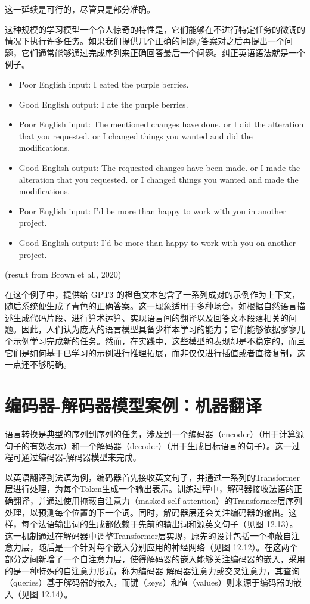 \documentclass[lang=cn,newtx,10pt,scheme=chinese]{elegantbook}
\begin{document}
这一延续是可行的，尽管只是部分准确。

这种规模的学习模型一个令人惊奇的特性是，它们能够在不进行特定任务的微调的情况下执行许多任务。如果我们提供几个正确的问题/答案对之后再提出一个问题，它们通常能够通过完成序列来正确回答最后一个问题。纠正英语语法就是一个例子。

\begin{itemize}
    \item Poor English input: I eated the purple berries.  
    \item Good English output: I ate the purple berries.  
    \item Poor English input: The mentioned changes have done. or I did the alteration that you requested. or I changed things you wanted and did the modifications. 
    \item Good English output: The requested changes have been made. or I made the alteration that you requested. or I changed things you wanted and made the modifications.  
    \item Poor English input: I’d be more than happy to work with you in another project. 
    \item Good English output: I’d be more than happy to work with you on another project. 
\end{itemize}
(result from Brown et al., 2020)


在这个例子中，提供给 GPT3 的橙色文本包含了一系列成对的示例作为上下文，随后系统便生成了青色的正确答案。这一现象适用于多种场合，如根据自然语言描述生成代码片段、进行算术运算、实现语言间的翻译以及回答文本段落相关的问题。因此，人们认为庞大的语言模型具备少样本学习的能力；它们能够依据寥寥几个示例学习完成新的任务。然而，在实践中，这些模型的表现却是不稳定的，而且它们是如何基于已学习的示例进行推理拓展，而非仅仅进行插值或者直接复制，这一点还不够明确。

\section{编码器-解码器模型案例：机器翻译}
语言转换是典型的序列到序列的任务，涉及到一个编码器（encoder）（用于计算源句子的有效表示）和一个解码器（decoder）（用于生成目标语言的句子）。这一过程可通过编码器-解码器模型来完成。

以英语翻译到法语为例，编码器首先接收英文句子，并通过一系列的Transformer层进行处理，为每个Token生成一个输出表示。训练过程中，解码器接收法语的正确翻译，并通过使用掩蔽自注意力（masked self-attention）的Transformer层序列处理，以预测每个位置的下一个词。同时，解码器层还会关注编码器的输出。这样，每个法语输出词的生成都依赖于先前的输出词和源英文句子（见图 12.13）。这一机制通过在解码器中调整Transformer层实现，原先的设计包括一个掩蔽自注意力层，随后是一个针对每个嵌入分别应用的神经网络（见图 12.12）。在这两个部分之间新增了一个自注意力层，使得解码器的嵌入能够关注编码器的嵌入，采用的是一种特殊的自注意力形式，称为编码器-解码器注意力或交叉注意力，其查询（queries）基于解码器的嵌入，而键（keys）和值（values）则来源于编码器的嵌入（见图 12.14）。
\end{document}
